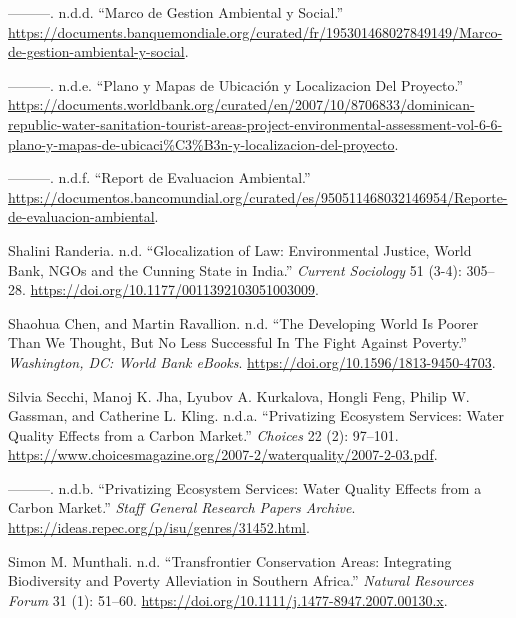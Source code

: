 \begin{CSLReferences}{1}{0}
---------. n.d.d. {``Marco de Gestion Ambiental y Social.''}
\url{https://documents.banquemondiale.org/curated/fr/195301468027849149/Marco-de-gestion-ambiental-y-social}.

---------. n.d.e. {``Plano y Mapas de Ubicación y Localizacion Del
Proyecto.''}
\url{https://documents.worldbank.org/curated/en/2007/10/8706833/dominican-republic-water-sanitation-tourist-areas-project-environmental-assessment-vol-6-6-plano-y-mapas-de-ubicaci\%C3\%B3n-y-localizacion-del-proyecto}.

---------. n.d.f. {``Report de Evaluacion Ambiental.''}
\url{https://documentos.bancomundial.org/curated/es/950511468032146954/Reporte-de-evaluacion-ambiental}.

Shalini Randeria. n.d. {``Glocalization of Law: Environmental Justice,
World Bank, NGOs and the Cunning State in India.''} \emph{Current
Sociology} 51 (3-4): 305--28.
\url{https://doi.org/10.1177/0011392103051003009}.

Shaohua Chen, and Martin Ravallion. n.d. {``The Developing World Is
Poorer Than We Thought, But No Less Successful In The Fight Against
Poverty.''} \emph{Washington, DC: World Bank eBooks}.
\url{https://doi.org/10.1596/1813-9450-4703}.

Silvia Secchi, Manoj K. Jha, Lyubov A. Kurkalova, Hongli Feng, Philip W.
Gassman, and Catherine L. Kling. n.d.a. {``Privatizing Ecosystem
Services: Water Quality Effects from a Carbon Market.''} \emph{Choices}
22 (2): 97--101.
\url{https://www.choicesmagazine.org/2007-2/waterquality/2007-2-03.pdf}.

---------. n.d.b. {``Privatizing Ecosystem Services: Water Quality
Effects from a Carbon Market.''} \emph{Staff General Research Papers
Archive}. \url{https://ideas.repec.org/p/isu/genres/31452.html}.

Simon M. Munthali. n.d. {``Transfrontier Conservation Areas: Integrating
Biodiversity and Poverty Alleviation in Southern Africa.''}
\emph{Natural Resources Forum} 31 (1): 51--60.
\url{https://doi.org/10.1111/j.1477-8947.2007.00130.x}.


\end{CSLReferences}

